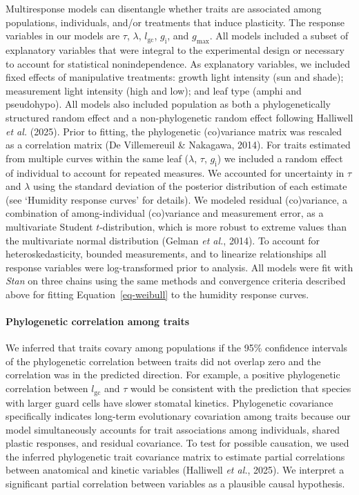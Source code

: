 \documentclass[
  letterpaper,
  DIV=11,
  numbers=noendperiod]{scrartcl}
\let\oldparagraph\paragraph
\renewcommand{\paragraph}[1]{\oldparagraph{#1}\mbox{}}
\newcommand{\gcl}{$l_\mathrm{gc}$}
\newcommand{\gi}{$g_\mathrm{i}$}
\newcommand{\gmax}{$g_\mathrm{max}$}
\begin{document}
Multiresponse models can disentangle whether traits are associated among
populations, individuals, and/or treatments that induce plasticity. The
response variables in our models are \(\tau\), \(\lambda\), \gcl, \gi,
and \gmax. All models included a subset of explanatory variables that
were integral to the experimental design or necessary to account for
statistical nonindependence. As explanatory variables, we included fixed
effects of manipulative treatments: growth light intensity (sun and
shade); measurement light intensity (high and low); and leaf type (amphi
and pseudohypo). All models also included population as both a
phylogenetically structured random effect and a non-phylogenetic random
effect following Halliwell \emph{et al.} (2025). Prior to fitting, the
phylogenetic (co)variance matrix was rescaled as a correlation matrix
(De Villemereuil \& Nakagawa, 2014). For traits estimated from multiple
curves within the same leaf (\(\lambda\), \(\tau\), \gi) we included a
random effect of individual to account for repeated measures. We
accounted for uncertainty in \(\tau\) and \(\lambda\) using the standard
deviation of the posterior distribution of each estimate (see `Humidity
response curves' for details). We modeled residual (co)variance, a
combination of among-individual (co)variance and measurement error, as a
multivariate Student \(t\)-distribution, which is more robust to extreme
values than the multivariate normal distribution (Gelman \emph{et al.},
2014). To account for heteroskedasticity, bounded measurements, and to
linearize relationships all response variables were log-transformed
prior to analysis. All models were fit with \emph{Stan} on three chains
using the same methods and convergence criteria described above for
fitting Equation~\ref{eq-weibull} to the humidity response curves.

\paragraph{Phylogenetic correlation among
traits}\label{phylogenetic-correlation-among-traits}

We inferred that traits covary among populations if the 95\% confidence
intervals of the phylogenetic correlation between traits did not overlap
zero and the correlation was in the predicted direction. For example, a
positive phylogenetic correlation between \gcl{} and \(\tau\) would be
consistent with the prediction that species with larger guard cells have
slower stomatal kinetics. Phylogenetic covariance specifically indicates
long-term evolutionary covariation among traits because our model
simultaneously accounts for trait associations among individuals, shared
plastic responses, and residual covariance. To test for possible
causation, we used the inferred phylogenetic trait covariance matrix to
estimate partial correlations between anatomical and kinetic variables
(Halliwell \emph{et al.}, 2025). We interpret a significant partial
correlation between variables as a plausible causal hypothesis.
\end{document}
